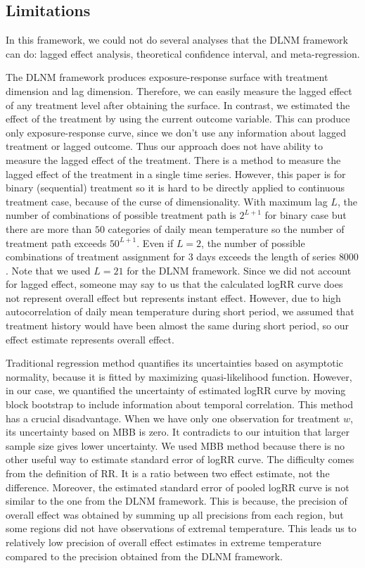 \documentclass[12pt]{article}
\begin{document}
\subsection{Limitations}

In this framework, we could not do several analyses that the DLNM framework can do:
lagged effect analysis, theoretical confidence interval, and meta-regression.

The DLNM framework produces exposure-response surface with treatment dimension and lag dimension.
Therefore, we can easily measure the lagged effect of any treatment level after obtaining the surface.
In contrast, we estimated the effect of the treatment by using the current outcome variable.
This can produce only exposure-response curve, 
since we don't use any information about lagged treatment or lagged outcome.
Thus our approach does not have ability to measure the lagged effect of the treatment.
There is a method to measure the lagged effect of the treatment in a single time series\cite{bojinov2019}.
However, this paper is for binary (sequential) treatment 
so it is hard to be directly applied to continuous treatment case,
because of the curse of dimensionality.
With maximum lag $L$, the number of combinations of possible treatment path is $2^{L+1}$ for binary case
but there are more than $50$ categories of daily mean temperature 
so the number of treatment path exceeds $50^{L+1}$.
Even if $L = 2$, 
the number of possible combinations of treatment assignment for 3 days exceeds the length of series $8000$.
Note that we used $L = 21$ for the DLNM framework.
Since we did not account for lagged effect, someone may say to us that 
the calculated logRR curve does not represent overall effect but represents instant effect.
However, due to high autocorrelation of daily mean temperature during short period, 
we assumed that treatment history would have been almost the same during short period,
so our effect estimate represents overall effect.

Traditional regression method quantifies its uncertainties based on asymptotic normality,
because it is fitted by maximizing quasi-likelihood function.
However, in our case, we quantified the uncertainty of estimated logRR curve by moving block bootstrap
to include information about temporal correlation.
This method has a crucial disadvantage.
When we have only one observation for treatment $w$, its uncertainty based on MBB is zero.
It contradicts to our intuition that larger sample size gives lower uncertainty.
We used MBB method because there is no other useful way to estimate standard error of logRR curve.
The difficulty comes from the definition of RR.
It is a ratio between two effect estimate, not the difference.
Moreover, the estimated standard error of pooled logRR curve is not similar to the one from the DLNM framework.
This is because,
the precision of overall effect was obtained by summing up all precisions from each region,
but some regions did not have observations of extremal temperature.
This leads us to relatively low precision of overall effect estimates in extreme temperature
compared to the precision obtained from the DLNM framework.
\end{document}
